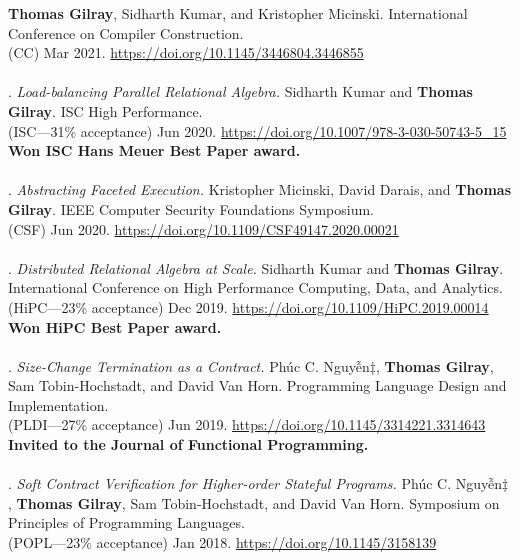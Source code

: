 \textbf{Thomas Gilray}, Sidharth Kumar, and Kristopher Micinski.
International Conference on Compiler Construction.
\\(CC) Mar 2021. \url{https://doi.org/10.1145/3446804.3446855}
\\ \vspace{-0.1cm}\\
\paper. \textit{Load-balancing Parallel Relational Algebra.}
Sidharth Kumar and \textbf{Thomas Gilray}.
ISC High Performance.
\\(ISC---31\% acceptance) Jun 2020. \url{https://doi.org/10.1007/978-3-030-50743-5_15}
\\\textbf{Won ISC Hans Meuer Best Paper award.} \\ \vspace{-0.1cm}\\
\paper. \textit{Abstracting Faceted Execution.}
Kristopher Micinski, David Darais, and \textbf{Thomas Gilray}.
IEEE Computer Security Foundations Symposium.
\\(CSF) Jun 2020. \url{https://doi.org/10.1109/CSF49147.2020.00021}
\\ \vspace{-0.1cm}\\
\paper. \textit{Distributed Relational Algebra at Scale.}
Sidharth Kumar and \textbf{Thomas Gilray}.
International Conference on High Performance Computing, Data, and Analytics.
\\(HiPC---23\% acceptance) Dec 2019. \url{https://doi.org/10.1109/HiPC.2019.00014}
\\\textbf{Won HiPC Best Paper award.} \\ \vspace{-0.1cm}\\
\paper. \textit{Size-Change Termination as a Contract.}
Phúc C. Nguyễn$\ddagger$, \textbf{Thomas Gilray}, Sam Tobin-Hochstadt, and David Van Horn.
Programming Language Design and Implementation.
\\(PLDI---27\% acceptance) Jun 2019. \url{https://doi.org/10.1145/3314221.3314643}
\\\textbf{Invited to the Journal of Functional Programming.} \\ \vspace{-0.1cm}\\
\paper. \textit{Soft Contract Verification for Higher-order Stateful Programs.}
Phúc C. Nguyễn$\ddagger$, \textbf{Thomas Gilray}, Sam Tobin-Hochstadt, and David Van Horn.
Symposium on Principles of Programming Languages.
\\(POPL---23\% acceptance) Jan 2018. \url{https://doi.org/10.1145/3158139}

